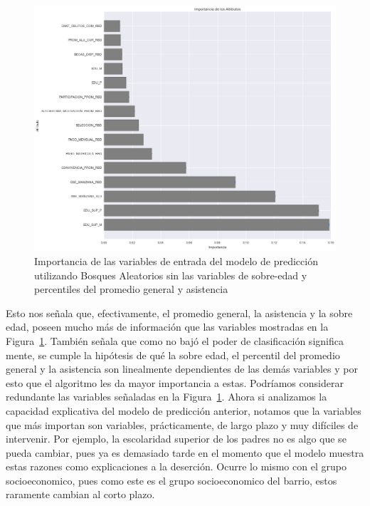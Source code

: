 \begin{figure}[H]
  \centering
    \includegraphics[trim=0cm 0cm 0cm 0cm,scale=0.4]{Figuras/7AnalisisResultado/impo-parcial.png}
      \caption{Importancia de las variables de entrada del modelo de predicción utilizando Bosques Aleatorios sin las variables de sobre-edad y percentiles del promedio general y asistencia}
    \label{fig:impo-parcial}
\end{figure}

Esto nos señala que, efectivamente, el promedio general, la asistencia y la sobre edad, poseen mucho más de información que las variables mostradas en la Figura~\ref{fig:impo-parcial}. También señala que como no bajó el poder de clasificación significa mente, se cumple la hipótesis de qué la sobre edad, el percentil del promedio general y la asistencia son linealmente dependientes de las demás variables y por esto que el algoritmo les da mayor importancia a estas. Podríamos considerar redundante las variables señaladas en la Figura~\ref{fig:impo-parcial}.
Ahora si analizamos la capacidad explicativa del modelo de predicción anterior, notamos que la variables que más importan son variables, prácticamente, de largo plazo y muy difíciles de intervenir. Por ejemplo, la escolaridad superior de los padres no es algo que se pueda cambiar, pues ya es demasiado tarde en el momento que el modelo muestra estas razones como explicaciones a la deserción. Ocurre lo mismo con el grupo socioeconomico, pues como este es el grupo socioeconomico del barrio, estos raramente cambian al corto plazo.


